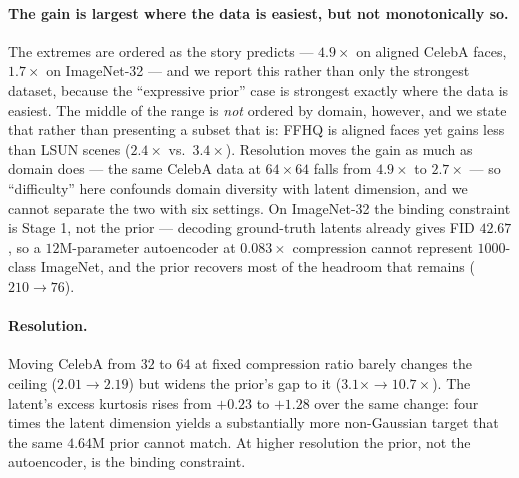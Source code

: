 \documentclass[sigconf,nonacm]{acmart}
\begin{document}
\paragraph{The gain is largest where the data is easiest, but not monotonically
so.}
The extremes are ordered as the story predicts --- $4.9\times$ on aligned CelebA
faces, $1.7\times$ on ImageNet-32 --- and we report this rather than only the
strongest dataset, because the ``expressive prior'' case is strongest exactly
where the data is easiest. The middle of the range is \emph{not} ordered by
domain, however, and we state that rather than presenting a subset that is:
FFHQ is aligned faces yet gains less than LSUN scenes ($2.4\times$ vs.\
$3.4\times$). Resolution moves the gain as much as domain does --- the same
CelebA data at $64{\times}64$ falls from $4.9\times$ to $2.7\times$ --- so
``difficulty'' here confounds domain diversity with latent dimension, and we
cannot separate the two with six settings. On ImageNet-32 the binding constraint is Stage 1, not the
prior --- decoding ground-truth latents already gives FID $42.67$, so a
$12$M-parameter autoencoder at $0.083\times$ compression cannot represent
$1000$-class ImageNet, and the prior recovers most of the headroom that
remains ($210 \rightarrow 76$).

\paragraph{Resolution.}
Moving CelebA from $32$ to $64$ at fixed compression ratio barely changes the
ceiling ($2.01 \to 2.19$) but widens the prior's gap to it ($3.1\times \to
10.7\times$). The latent's excess kurtosis rises from $+0.23$ to $+1.28$ over
the same change: four times the latent dimension yields a substantially more
non-Gaussian target that the same $4.64$M prior cannot match. At higher
resolution the prior, not the autoencoder, is the binding constraint.
\end{document}
